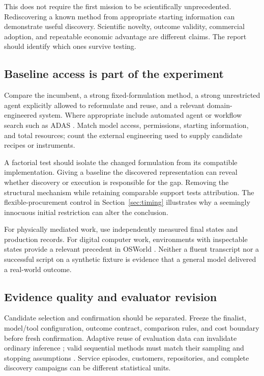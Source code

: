 \documentclass[11pt,letterpaper]{article}
\newcommand{\1}{\mathbf 1}
\theoremstyle{remark}\newtheorem{remark}{Remark}[section]
\begin{document}
This does not require the first mission to be scientifically unprecedented. Rediscovering a known method from appropriate starting information can demonstrate useful discovery. Scientific novelty, outcome validity, commercial adoption, and repeatable economic advantage are different claims. The report should identify which ones survive testing.

\subsection{Baseline access is part of the experiment}
Compare the incumbent, a strong fixed-formulation method, a strong unrestricted agent explicitly allowed to reformulate and reuse, and a relevant domain-engineered system. Where appropriate include automated agent or workflow search such as ADAS \citep{adas}. Match model access, permissions, starting information, and total resources; count the external engineering used to supply candidate recipes or instruments.

A factorial test should isolate the changed formulation from its compatible implementation. Giving a baseline the discovered representation can reveal whether discovery or execution is responsible for the gap. Removing the structural mechanism while retaining comparable support tests attribution. The flexible-procurement control in Section~\ref{sec:timing} illustrates why a seemingly innocuous initial restriction can alter the conclusion.

For physically mediated work, use independently measured final states and production records. For digital computer work, environments with inspectable states provide a relevant precedent in OSWorld \citep{osworld}. Neither a fluent transcript nor a successful script on a synthetic fixture is evidence that a general model delivered a real-world outcome.

\subsection{Evidence quality and evaluator revision}
Candidate selection and confirmation should be separated. Freeze the finalist, model/tool configuration, outcome contract, comparison rules, and cost boundary before fresh confirmation. Adaptive reuse of evaluation data can invalidate ordinary inference \citep{dwork}; valid sequential methods must match their sampling and stopping assumptions \citep{howard}. Service episodes, customers, repositories, and complete discovery campaigns can be different statistical units.
\end{document}

